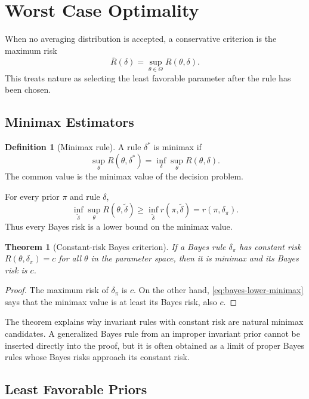 \documentclass[12pt,oneside]{book}
\numberwithin{equation}{section}
\theoremstyle{definition}
\newtheorem{definition}{Definition}[section]
\theoremstyle{plain}
\newtheorem{theorem}{Theorem}[section]
\theoremstyle{remark}
\begin{document}
\section{Worst Case Optimality}

When no averaging distribution is accepted, a conservative criterion is the
maximum risk
\[
    \overline R(\delta)=\sup_{\theta\in\Theta}R(\theta,\delta).
\]
This treats nature as selecting the least favorable parameter after the rule
has been chosen.

\subsection{Minimax Estimators}

\begin{definition}[Minimax rule]
A rule $\delta^*$ is minimax if
\[
    \sup_\theta R(\theta,\delta^*)
    =\inf_\delta\sup_\theta R(\theta,\delta).
\]
The common value is the minimax value of the decision problem.
\end{definition}

For every prior $\pi$ and rule $\delta$,
\begin{equation}
    \inf_{\widetilde\delta}\sup_\theta R(\theta,\widetilde\delta)
    \geq \inf_{\widetilde\delta}r(\pi,\widetilde\delta)
    =r(\pi,\delta_\pi).
    \label{eq:bayes-lower-minimax}
\end{equation}
Thus every Bayes risk is a lower bound on the minimax value.

\begin{theorem}[Constant-risk Bayes criterion]
If a Bayes rule $\delta_\pi$ has constant risk $R(\theta,\delta_\pi)=c$ for
all $\theta$ in the parameter space, then it is minimax and its Bayes risk is
$c$.
\end{theorem}

\begin{proof}
The maximum risk of $\delta_\pi$ is $c$.  On the other hand,
\eqref{eq:bayes-lower-minimax} says that the minimax value is at least its
Bayes risk, also $c$.
\end{proof}

The theorem explains why invariant rules with constant risk are natural
minimax candidates.  A generalized Bayes rule from an improper invariant
prior cannot be inserted directly into the proof, but it is often obtained as
a limit of proper Bayes rules whose Bayes risks approach its constant risk.

\subsection{Least Favorable Priors}
\end{document}
